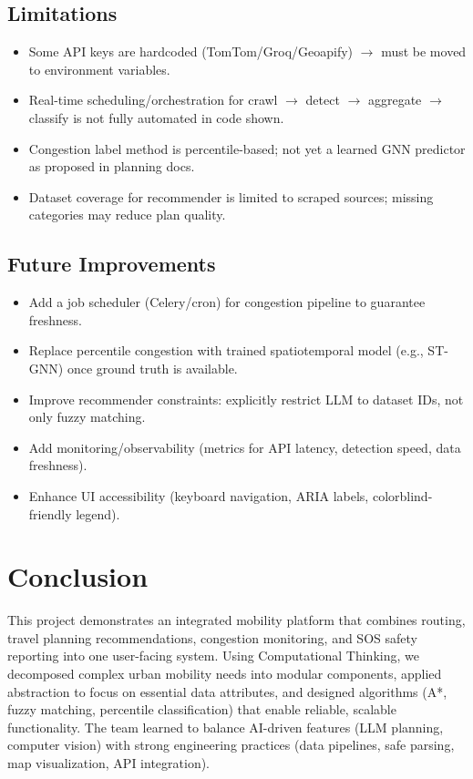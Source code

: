 \section{Limitations}
\begin{itemize}
  \item Some API keys are hardcoded (TomTom/Groq/Geoapify) $\rightarrow$ must be moved to environment variables.
  \item Real-time scheduling/orchestration for crawl $\rightarrow$ detect $\rightarrow$ aggregate $\rightarrow$ classify is not fully automated in code shown.
  \item Congestion label method is percentile-based; not yet a learned GNN predictor as proposed in planning docs.
  \item Dataset coverage for recommender is limited to scraped sources; missing categories may reduce plan quality.
\end{itemize}

\section{Future Improvements}
\begin{itemize}
  \item Add a job scheduler (Celery/cron) for congestion pipeline to guarantee freshness.
  \item Replace percentile congestion with trained spatiotemporal model (e.g., ST-GNN) once ground truth is available.
  \item Improve recommender constraints: explicitly restrict LLM to dataset IDs, not only fuzzy matching.
  \item Add monitoring/observability (metrics for API latency, detection speed, data freshness).
  \item Enhance UI accessibility (keyboard navigation, ARIA labels, colorblind-friendly legend).
\end{itemize}

\chapter{Conclusion}
\label{chap:conclusion}

This project demonstrates an integrated mobility platform that combines routing, travel planning recommendations, congestion monitoring, and SOS safety reporting into one user-facing system. Using Computational Thinking, we decomposed complex urban mobility needs into modular components, applied abstraction to focus on essential data attributes, and designed algorithms (A*, fuzzy matching, percentile classification) that enable reliable, scalable functionality. The team learned to balance AI-driven features (LLM planning, computer vision) with strong engineering practices (data pipelines, safe parsing, map visualization, API integration).

